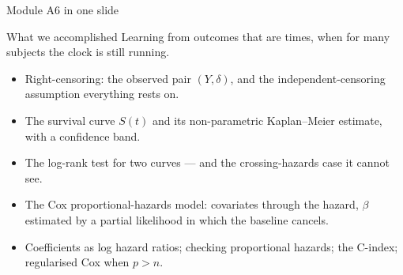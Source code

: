 \documentclass[aspectratio=169,11pt]{beamer}
\begin{document}
\begin{frame}{Module A6 in one slide}
  \begin{block}{What we accomplished}
    Learning from outcomes that are times, when for many subjects the clock is
    still running.
  \end{block}
  \begin{itemize}
    \item Right-censoring: the observed pair $(Y,\delta)$, and the
          independent-censoring assumption everything rests on.
    \item The survival curve $S(t)$ and its non-parametric Kaplan--Meier estimate,
          with a confidence band.
    \item The log-rank test for two curves --- and the crossing-hazards case it
          cannot see.
    \item The Cox proportional-hazards model: covariates through the hazard, $\beta$
          estimated by a partial likelihood in which the baseline cancels.
    \item Coefficients as log hazard ratios; checking proportional hazards; the
          C-index; regularised Cox when $p>n$.
  \end{itemize}
\end{frame}
\end{document}
